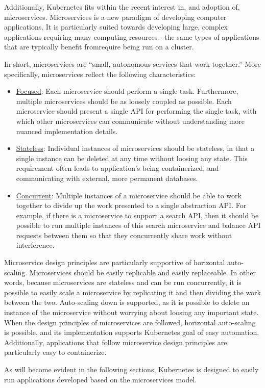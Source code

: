 Additionally, Kubernetes fits within the recent interest in, and adoption of,
microservices. Microservices is a new paradigm of developing computer
applications. It is particularly suited towards developing large, complex
applications requiring many computing resources - the same types of applications
that are typically benefit from\/require being run on a cluster.

In short, microservices are ``small, autonomous services that work
together.''\cite[pg. 2]{building-microservices-designing-fine-grained-systems}
More specifically, microservices reflect the following characteristics:

\begin{itemize}
  \item \underline{Focused}: Each microservice should perform a single task.
    Furthermore, multiple microservices should be as loosely coupled as
    possible. Each microservice should present a single API for performing the
    single task, with which other microservices can communicate without
    understanding more nuanced implementation
    details.\cite{building-microservices-designing-fine-grained-systems}
  \item \underline{Stateless}: Individual instances of microservices should be stateless, in
    that a single instance can be deleted at any time without loosing any state.
    This requirement often leads to application's being containerized, and
    communicating with external, more permanent databases.
  \item \underline{Concurrent}: Multiple instances of a microservice should be
    able to work together to divide up the work presented to a single
    abstraction API. For example, if there is a microservice to support
    a search API, then it should be possible to run multiple instances of this
    search microservice and balance API requests between them so that they
    concurrently share work without interference.
\end{itemize}

Microservice design principles are particularly supportive of horizontal
auto-scaling. Microservices should be easily replicable and easily replaceable.
In other words, because microservices are stateless and can be run concurrently,
it is possible to easily scale a microservice by replicating it and then
dividing the work between the two. Auto-scaling down is supported, as it is
possible to delete an instance of the microservice without worrying about
loosing any important state. When the design principles of
microservices are followed, horizontal auto-scaling is possible, and its
implementation supports Kubernetes goal of easy automation. Additionally,
applications that follow microservice design principles are particularly easy to
containerize.

As will become evident in the following sections, Kubernetes is designed to
easily run applications developed based on the microservices model.
